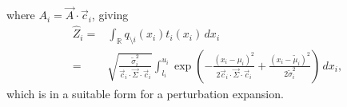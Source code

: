 \documentclass[11pt,twoside]{report}
\begin{document}
where $A_i = \vec{A} \cdot \vec{c}_i$, giving
\begin{align}
  \widehat{Z}_i
  =&
  \int_{\mathbb{R}} q_{\setminus i}(x_i) t_i(x_i) \, dx_i
  \nonumber \\ =&
  \sqrt{ \frac{\widetilde{\sigma}_i^2}{\vec{c}_i \cdot \vec{\Sigma} \cdot \vec{c}_i} }
  \int_{l_i}^{u_i}
  \exp{\left( -\frac{(x_i - \mu_i)^2}{2 \vec{c}_i \cdot \vec{\Sigma} \cdot \vec{c}_i} +
    \frac{(x_i - \widetilde{\mu}_i)^2}{2 \widetilde{\sigma}_i^2} \right)}
  \, dx_i,
\end{align}
which is in a suitable form for a perturbation expansion.
\end{document}
